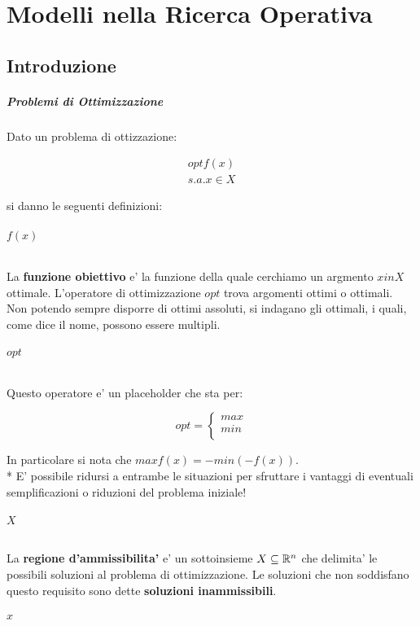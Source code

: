 \chapter{Modelli nella Ricerca Operativa}

\section{Introduzione}

\paragraph{Problemi di Ottimizzazione}

Dato un problema di ottizzazione:

\begin{align*}
    \text{$opt f(x)$} \\
    \text{$s.a. x \in X$}
\end{align*}

si danno le seguenti definizioni:

\subparagraph{$f(x)$}

La \textbf{funzione obiettivo} e' la funzione della quale cerchiamo un argmento $x in X$ ottimale.
L'operatore di ottimizzazione $opt$ trova argomenti ottimi o ottimali.
Non potendo sempre disporre di ottimi assoluti, si indagano gli ottimali, i quali, come dice il nome, possono essere multipli.

\subparagraph{$opt$}

Questo operatore e' un placeholder che sta per:

\[
    opt =
    \begin{cases}
        \text {$max$} \\
        \text {$min$} \\
    \end{cases}
\]

In particolare si nota che $max f(x) = - min (- f(x))$. \\*
E' possibile ridursi a entrambe le situazioni per sfruttare i vantaggi di eventuali semplificazioni o riduzioni del problema iniziale!

\subparagraph{$X$}

La \textbf{regione d'ammissibilita'} e' un sottoinsieme $X \subseteq \mathbb{R}^n$ che delimita' le possibili soluzioni al problema di ottimizzazione.
Le soluzioni che non soddisfano questo requisito sono dette \textbf{soluzioni inammissibili}.

\subparagraph{$x$}

